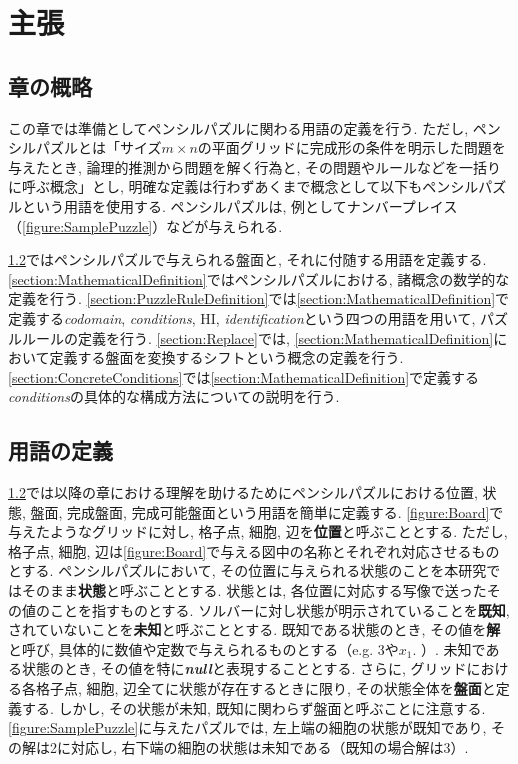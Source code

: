 \chapter{主張}\label{chapter:Prepare}
\section{章の概略}\label{section:Outline}
この章では準備としてペンシルパズルに関わる用語の定義を行う. ただし, ペンシルパズルとは「サイズ$m\times n$の平面グリッドに完成形の条件を明示した問題を与えたとき, 論理的推測から問題を解く行為と, その問題やルールなどを一括りに呼ぶ概念」とし, 明確な定義は行わずあくまで概念として以下もペンシルパズルという用語を使用する.
ペンシルパズルは, 例としてナンバープレイス（\cref{figure:SamplePuzzle}）などが与えられる.

\cref{section:WordDefinition}ではペンシルパズルで与えられる盤面と, それに付随する用語を定義する.
\cref{section:MathematicalDefinition}ではペンシルパズルにおける, 諸概念の数学的な定義を行う.
\cref{section:PuzzleRuleDefinition}では\cref{section:MathematicalDefinition}で定義する\textit{codomain}, \textit{conditions}, HI, \textit{identification}という四つの用語を用いて, パズルルールの定義を行う.
\cref{section:Replace}では, \cref{section:MathematicalDefinition}において定義する盤面を変換するシフトという概念の定義を行う.
\cref{section:ConcreteConditions}では\cref{section:MathematicalDefinition}で定義する\textit{conditions}の具体的な構成方法についての説明を行う.

\section{用語の定義}\label{section:WordDefinition}
\cref{section:WordDefinition}では以降の章における理解を助けるためにペンシルパズルにおける位置, 状態, 盤面, 完成盤面, 完成可能盤面という用語を簡単に定義する. \cref{figure:Board}で与えたようなグリッドに対し, 格子点, 細胞, 辺を\textbf{位置}と呼ぶこととする. ただし, 格子点, 細胞, 辺は\cref{figure:Board}で与える図中の名称とそれぞれ対応させるものとする. ペンシルパズルにおいて, その位置に与えられる状態のことを本研究ではそのまま\textbf{状態}と呼ぶこととする. 状態とは, 各位置に対応する写像で送ったその値のことを指すものとする. ソルバーに対し状態が明示されていることを\textbf{既知}, されていないことを\textbf{未知}と呼ぶこととする. 既知である状態のとき, その値を\textbf{解}と呼び, 具体的に数値や定数で与えられるものとする（e.g. 3や$x_1$. ）. 未知である状態のとき, その値を特に\textbf{\textit{null}}と表現することとする. さらに, グリッドにおける各格子点, 細胞, 辺全てに状態が存在するときに限り, その状態全体を\textbf{盤面}と定義する. しかし, その状態が未知, 既知に関わらず盤面と呼ぶことに注意する. \cref{figure:SamplePuzzle}に与えたパズルでは, 左上端の細胞の状態が既知であり, その解は2に対応し, 右下端の細胞の状態は未知である（既知の場合解は3）.

